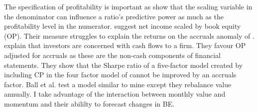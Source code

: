 The specification of profitability is important as \textcite{ball2015deflating}
show that the scaling variable in the denominator can influence a ratio's
predictive power as much as the profitability level in the numerator.
\textcite{fama2006profitability} suggest net income scaled by
book equity (OP).
Their measure struggles to explain the returns on the accruals anomaly of
\textcite{sloan1996stock}.
\textcite{ball2016accruals} explain that investors are concerned with cash
flows to a firm.
They favour OP adjusted for accruals as these are the non-cash components of
financial statements.
They show that the Sharpe ratio of a five-factor model created by including CP
in the four factor model of \textcite{carhart1997persistence} cannot be
improved by an accruals factor.
Ball et al. test a model similar to mine except they rebalance value annually.
I take advantage of the interaction between monthly value and momentum and
their abililty to forecast changes in BE.

